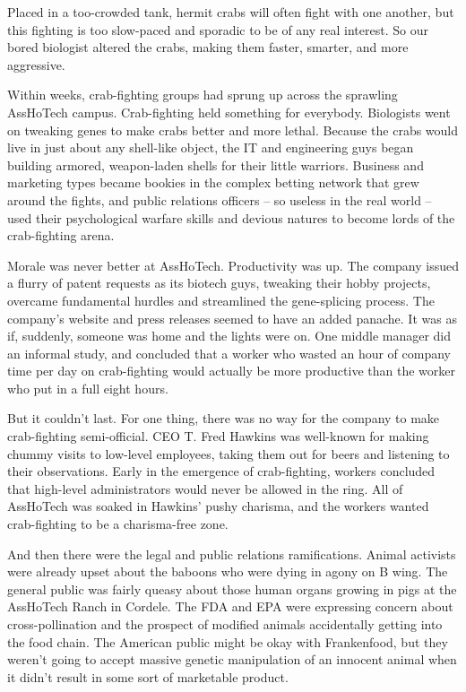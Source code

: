 \documentclass[a4paper,10pt]{article}
\begin{document}
Placed in a too-crowded tank, hermit crabs will often fight with one another, but this fighting is too slow-paced and sporadic to be of any real interest. So our bored biologist altered the crabs, making them faster, smarter, and more aggressive.

Within weeks, crab-fighting groups had sprung up across the sprawling AssHoTech campus. Crab-fighting held something for everybody. Biologists went on tweaking genes to make crabs better and more lethal. Because the crabs would live in just about any shell-like object, the IT and engineering guys began building armored, weapon-laden shells for their little warriors. Business and marketing types became bookies in the complex betting network that grew around the fights, and public relations officers -- so useless in the real world -- used their psychological warfare skills and devious natures to become lords of the crab-fighting arena.

Morale was never better at AssHoTech. Productivity was up. The company issued a flurry of patent requests as its biotech guys, tweaking their hobby projects, overcame fundamental hurdles and streamlined the gene-splicing process. The company's website and press releases seemed to have an added panache. It was as if, suddenly, someone was home and the lights were on. One middle manager did an informal study, and concluded that a worker who wasted an hour of company time per day on crab-fighting would actually be more productive than the worker who put in a full eight hours.

But it couldn't last. For one thing, there was no way for the company to make crab-fighting semi-official. CEO T. Fred Hawkins was well-known for making chummy visits to low-level employees, taking them out for beers and listening to their observations. Early in the emergence of crab-fighting, workers concluded that high-level administrators would never be allowed in the ring. All of AssHoTech was soaked in Hawkins' pushy charisma, and the workers wanted crab-fighting to be a charisma-free zone.

And then there were the legal and public relations ramifications. Animal activists were already upset about the baboons who were dying in agony on B wing. The general public was fairly queasy about those human organs growing in pigs at the AssHoTech Ranch in Cordele. The FDA and EPA were expressing concern about cross-pollination and the prospect of modified animals accidentally getting into the food chain. The American public might be okay with Frankenfood, but they weren't going to accept massive genetic manipulation of an innocent animal when it didn't result in some sort of marketable product.
\end{document}
